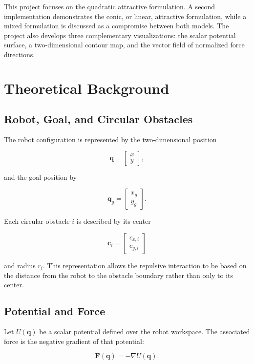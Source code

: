 \documentclass[10pt,twocolumn,a4paper]{article}
\begin{document}
This project focuses on the quadratic attractive formulation. A second
implementation demonstrates the conic, or linear, attractive formulation,
while a mixed formulation is discussed as a compromise between both models.
The project also develops three complementary visualizations: the scalar
potential surface, a two-dimensional contour map, and the vector field of
normalized force directions.

\section{Theoretical Background}

\subsection{Robot, Goal, and Circular Obstacles}

The robot configuration is represented by the two-dimensional position

\[
    \mathbf{q}
    =
    \begin{bmatrix}
        x \\
        y
    \end{bmatrix},
\]

and the goal position by

\[
    \mathbf{q}_g
    =
    \begin{bmatrix}
        x_g \\
        y_g
    \end{bmatrix}.
\]

Each circular obstacle $i$ is described by its center

\[
    \mathbf{c}_i
    =
    \begin{bmatrix}
        c_{x,i} \\
        c_{y,i}
    \end{bmatrix}
\]

and radius $r_i$. This representation allows the repulsive interaction to
be based on the distance from the robot to the obstacle boundary rather than
only to its center.

\subsection{Potential and Force}

Let $U(\mathbf{q})$ be a scalar potential defined over the robot workspace.
The associated force is the negative gradient of that potential:

\begin{equation}
    \mathbf{F}(\mathbf{q})
    =
    -\nabla U(\mathbf{q}).
    \label{eq:negative_gradient}
\end{equation}
\end{document}
